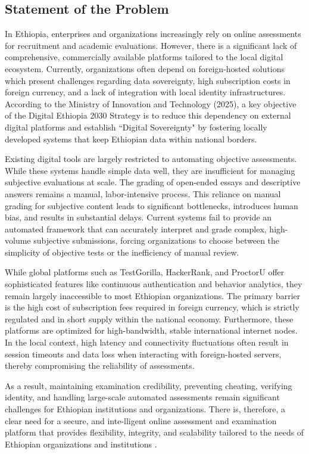 \subsection{Statement of the Problem}
In Ethiopia, enterprises and organizations increasingly rely on online assessments for recruitment and academic evaluations. However, there is a significant lack of comprehensive, commercially available platforms tailored to the local digital ecosystem. Currently, organizations often depend on foreign-hosted solutions which present challenges regarding data sovereignty, high subscription costs in foreign currency, and a lack of integration with local identity infrastructures. According to the Ministry of Innovation and Technology (2025), a key objective of the Digital Ethiopia 2030 Strategy is to reduce this dependency on external digital platforms and establish ``Digital Sovereignty" by fostering locally developed systems that keep Ethiopian data within national borders.

Existing digital tools are largely restricted to automating objective assessments. While these systems handle simple data well, they are insufficient for managing subjective evaluations at scale. The grading of open-ended essays and descriptive answers remains a manual, labor-intensive process. This reliance on manual grading for subjective content leads to significant bottlenecks, introduces human bias, and results in substantial delays. Current systems fail to provide an automated framework that can accurately interpret and grade complex, high-volume subjective submissions, forcing organizations to choose between the simplicity of objective tests or the inefficiency of manual review.

While global platforms such as TestGorilla, HackerRank, and ProctorU offer sophisticated features like continuous authentication and behavior analytics, they remain largely inaccessible to most Ethiopian organizations. The primary barrier is the high cost of subscription fees required in foreign currency, which is strictly regulated and in short supply within the national economy. Furthermore, these platforms are optimized for high-bandwidth, stable international internet nodes. In the local context, high latency and connectivity fluctuations often result in session timeouts and data loss when interacting with foreign-hosted servers, thereby compromising the reliability of  assessments.

As a result, maintaining examination credibility, preventing cheating, verifying identity, and handling large-scale automated assessments remain significant challenges for Ethiopian institutions and organizations. There is, therefore, a clear need for a secure, and inte-lligent online assessment and examination platform that provides flexibility, integrity, and scalability tailored to the needs of Ethiopian organizations and institutions .


